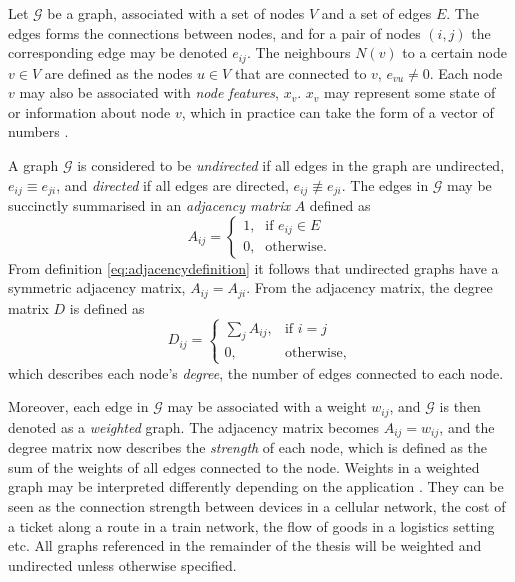 Let $\mathcal{G}$ be a graph, associated with a set of nodes $V$ and a set of edges $E$. The edges forms the connections between nodes, and for a pair of nodes $(i,j)$ the corresponding edge may be denoted $e_{ij}$. The neighbours $N(v)$ to a certain node $v \in V$ are defined as the nodes $u \in V$ that are connected to $v$, $e_{vu} \neq 0$. Each node $v$ may also be associated with \textit{node features}, $x_v$. $x_v$ may represent some state of or information about node $v$, which in practice can take the form of a vector of numbers \cite{active_learning_node_classification}.

A graph $\mathcal{G}$ is considered to be \textit{undirected} if all edges in the graph are undirected, $e_{ij} \equiv e_{ji}$, and \textit{directed} if all edges are directed, $e_{ij} \not\equiv e_{ji}$. The edges in $\mathcal{G}$ may be succinctly summarised in an \textit{adjacency matrix} $A$ defined as
\begin{equation}
    A_{ij} = \begin{cases} \mbox{1,} & \mbox{if } e_{ij} \in E \\ \mbox{0,} & \mbox{otherwise.} \end{cases}
    \label{eq:adjacencydefinition}
\end{equation}
From definition \eqref{eq:adjacencydefinition} it follows that undirected graphs have a symmetric adjacency matrix, $A_{ij} = A_{ji}$. From the adjacency matrix, the degree matrix $D$ is defined as
\begin{equation}
    D_{ij} = \begin{cases} \sum_j A_{ij}, & \mbox{if } i = j \\ \mbox{0,} & \mbox{otherwise,} \end{cases}
    \label{eq:degreematrixdefinition}
\end{equation}
which describes each node's \textit{degree}, the number of edges connected to each node.

Moreover, each edge in $\mathcal{G}$ may be associated with a weight $w_{ij}$, and $\mathcal{G}$ is then denoted as a \textit{weighted} graph. The adjacency matrix becomes $A_{ij} = w_{ij}$, and the degree matrix now describes the \textit{strength} of each node, which is defined as the sum of the weights of all edges connected to the node. Weights in a weighted graph may be interpreted differently depending on the application \cite{adventures_in_graph_theory_chap1}. They can be seen as the connection strength between devices in a cellular network, the cost of a ticket along a route in a train network, the flow of goods in a logistics setting etc. All graphs referenced in the remainder of the thesis will be weighted and undirected unless otherwise specified.

